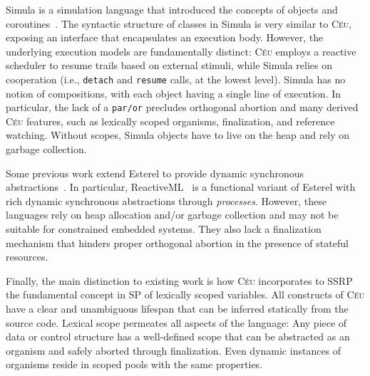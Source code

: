 \documentclass{sigplanconf}
\newcommand{\CEU}{\textsc{C\'{e}u}\xspace}
\newcommand{\code}[1] {{\small{\texttt{#1}}}}
\newcommand{\1}{\;}
\newcommand{\2}{\;\;}
\newcommand{\3}{\;\;\;}
\newcommand{\5}{\;\;\;\;\;}
\begin{document}
Simula is a simulation language that introduced the concepts of objects and 
coroutines~\cite{simula}.
%
The syntactic structure of classes in Simula is very similar to \CEU, exposing 
an interface that encapsulates an execution body.
%
However, the underlying execution models are fundamentally distinct:
\CEU employs a reactive scheduler to resume trails based on external stimuli, 
while Simula relies on cooperation (i.e., \code{detach} and \code{resume} 
calls, at the lowest level).
%
Simula has no notion of compositions, with each object having a single line of 
execution.
In particular, the lack of a \code{par/or} precludes orthogonal abortion and 
many derived \CEU features, such as lexically scoped organisms, finalization, 
and reference watching.
%
Without scopes, Simula objects have to live on the heap and rely on garbage 
collection.
%

Some previous work extend Esterel to provide dynamic synchronous 
abstractions~\cite{rp.scripts,rp.oo,sugarcubes}.
%
In particular, ReactiveML~\cite{rml} is a functional variant of Esterel with 
rich dynamic synchronous abstractions through \emph{processes}.
%
However, these languages rely on heap allocation and/or garbage collection and 
may not be suitable for constrained embedded systems.
%
%
They also lack a finalization mechanism that hinders proper orthogonal abortion 
in the presence of stateful resources.

Finally, the main distinction to existing work is how \CEU incorporates to SSRP 
the fundamental concept in SP of lexically scoped variables.
%
All constructs of \CEU have a clear and unambiguous lifespan that can be 
inferred statically from the source code.
%
Lexical scope permeates all aspects of the language:
Any piece of data or control structure has a well-defined scope that can be 
abstracted as an organism and safely aborted through finalization.
%
Even dynamic instances of organisms reside in scoped pools with the same 
properties.
%
\end{document}
